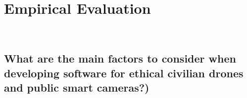 \section{Empirical Evaluation}~\label{sec:evaluation}

\subsection{What are the main factors to consider when developing software for ethical civilian drones and public smart cameras?)}~\label{subsec:RQs}